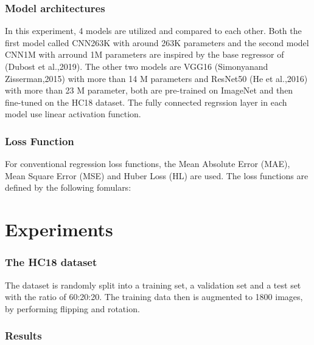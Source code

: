 \documentclass{article}
\begin{document}
\subsubsection{Model architectures}

In this experiment, 4 models are utilized and compared to each other. Both the first model called CNN263K with around 263K parameters and the second model CNN1M with arround 1M parameters are inspired by the base regressor of (Dubost et al.,2019). The other two models are VGG16 (Simonyanand Zisserman,2015) with more than 14 M parameters and ResNet50 (He et al.,2016) with more than 23 M parameter, both are pre-trained on ImageNet and then fine-tuned on the HC18 dataset. The fully connected regrssion layer in each model use linear activation function.
\subsubsection{Loss Function}
For conventional regression loss functions, the Mean Absolute Error (MAE), Mean Square Error (MSE) and Huber Loss (HL) are used. The loss functions are defined by the following fomulars:


\section{Experiments}

\subsubsection{The HC18 dataset}
The dataset is randomly split into a training set, a validation set and a test set with the ratio of 60:20:20. The training data then is augmented to 1800 images, by performing flipping and rotation. 

\subsubsection{Results}
\end{document}
